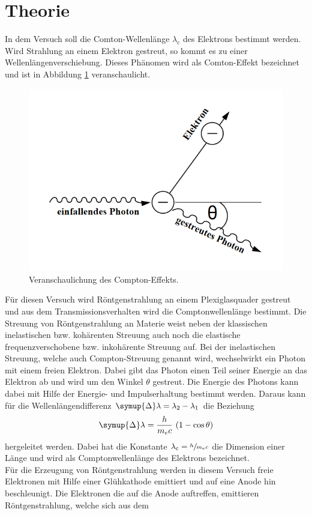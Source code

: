 \section{Theorie}
\label{sec:Theorie}
In dem Versuch soll die Comton-Wellenlänge $\lambda_\text{c}$ des Elektrons bestimmt werden.
Wird Strahlung an einem Elektron gestreut, so kommt es zu einer Wellenlängenverschiebung. Dieses Phänomen wird als Comton-Effekt bezeichnet und ist in Abbildung \ref{fig:com} veranschaulicht.
\begin{figure}
    \centering
    \caption{Veranschaulichung des Compton-Effekts.\cite{v603}}
    \label{fig:com}
    \includegraphics[width = 0.6 \textwidth]{pics/comton.png}
\end{figure}
Für diesen Versuch wird Röntgenstrahlung an einem Plexiglasquader gestreut und aus dem Transmissionsverhalten wird die Comptonwellenlänge bestimmt.
Die Streuung von Röntgenstrahlung an Materie weist neben der klassischen inelastischen bzw. kohärenten Streuung auch noch die elastische frequenzverschobene bzw. inkohärente Streuung auf.
Bei der inelastischen Streuung, welche auch Compton-Streuung genannt wird, wechselwirkt ein Photon mit einem freien Elektron. Dabei gibt das Photon einen Teil seiner Energie an das Elektron ab und wird um den Winkel $\theta$ gestreut. 
Die Energie des Photons kann dabei mit Hilfe der Energie- und Impulserhaltung bestimmt werden. Daraus kann für die Wellenlängendifferenz $\symup{\Delta}\lambda = \lambda_2 - \lambda_1$ die Beziehung
\begin{equation}
    \symup{\Delta}\lambda= \frac{h}{m_e c} \, \left(1-\cos \theta\right)
    \label{eqn:comton}
\end{equation} 
hergeleitet werden. Dabei hat die Konstante $\lambda_\text{c}= \sfrac{h}{m_e c}$ die Dimension einer Länge und wird als Comptonwellenlänge des Elektrons bezeichnet.
\\
Für die Erzeugung von Röntgenstrahlung werden in diesem Versuch freie Elektronen mit Hilfe einer Glühkathode emittiert und auf eine Anode hin beschleunigt. Die Elektronen die auf die Anode auftreffen, emittieren Röntgenstrahlung, welche sich aus dem
